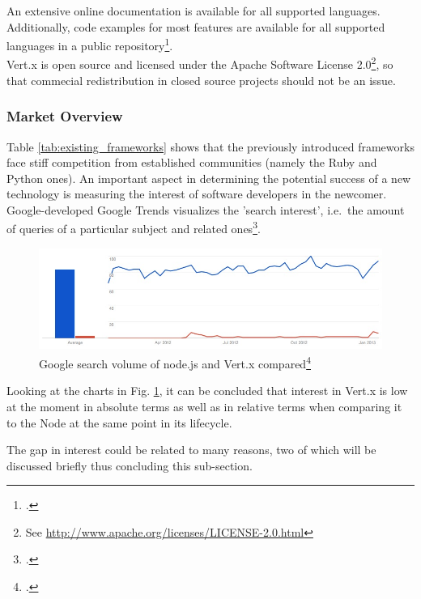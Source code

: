 
An extensive online documentation is available for all supported languages.
Additionally, code examples for most features are available for all supported languages in
a public repository\footcite[Cf.][]{Fox_2013}.\\
Vert.x is open source and licensed under the Apache Software License
2.0\footnote{See \url{http://www.apache.org/licenses/LICENSE-2.0.html}}, so that
commecial redistribution in closed source projects should not be an issue.

\subsubsection{Market Overview}
\label{frameworks_overview}

Table \ref{tab:existing_frameworks} shows that the previously introduced frameworks face stiff competition from established communities (namely the Ruby and Python ones). An important aspect in determining the potential success of a new technology is measuring the interest of software developers in the newcomer. Google-developed Google Trends visualizes the 'search interest', i.e.\ the amount of queries of a particular subject and related ones\footcite[Cf.][]{g_trends}.

\begin{figure}[hbtp]
\centering
\includegraphics[scale=0.5]{img/googletrend_nodevertx}
\caption{Google search volume of node.js and Vert.x compared\footcite[Cf.][]{g_trends}\label{img_googletrend_nodevertx}}
\end{figure}

Looking at the charts in Fig. \ref{img_googletrend_nodevertx}, it can be concluded that interest in Vert.x is low at the moment in absolute terms as well as in relative terms when comparing it to the Node at the same point in its lifecycle.

The gap in interest could be related to many reasons, two of which will be discussed briefly thus concluding this sub-section.

